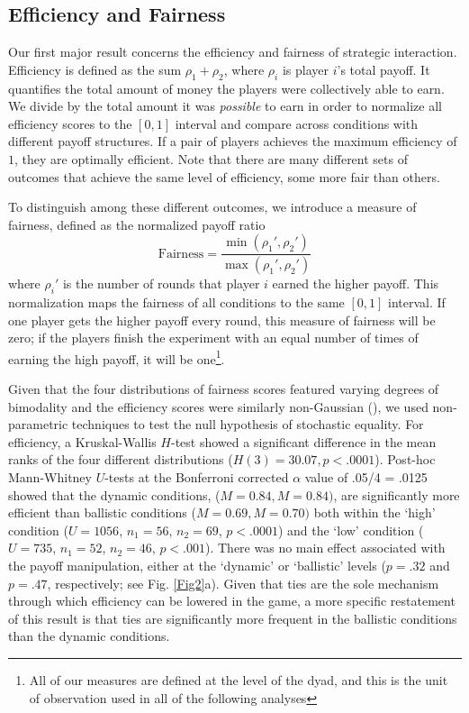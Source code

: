 \documentclass[10pt,letterpaper]{article}
\begin{document}
\subsection*{Efficiency and Fairness} Our first major result concerns the efficiency and fairness of strategic interaction. Efficiency is defined as the sum $\rho_1 + \rho_2$, where $\rho_i$ is player $i$'s total payoff. It quantifies the total amount of money the players were collectively able to earn. We divide by the total amount it was \emph{possible} to earn in order to normalize all efficiency scores to the $[0,1]$ interval and compare across conditions with different payoff structures. If a pair of players achieves the maximum efficiency of $1$, they are optimally efficient. Note that there are many different sets of outcomes that achieve the same level of efficiency, some more fair than others.

To distinguish among these different outcomes, we introduce a measure of fairness, defined as the normalized payoff ratio $$\text{Fairness} = \frac{\min(\rho_1', \rho_2')}{\max(\rho_1', \rho_2')}$$ where $\rho_i'$ is the number of rounds that player $i$ earned the higher payoff. This normalization maps the fairness of all conditions to the same $[0,1]$ interval. If one player gets the higher payoff every round, this measure of fairness will be zero; if the players finish the experiment with an equal number of times of earning the high payoff, it will be one\footnote{All of our measures are defined at the level of the dyad, and this is the unit of observation used in all of the following analyses}. 

Given that the four distributions of fairness scores featured varying degrees of bimodality and the efficiency scores were similarly non-Gaussian (), we used non-parametric techniques to test the null hypothesis of stochastic equality. For efficiency, a Kruskal-Wallis $H$-test showed a significant difference in the mean ranks of the four different distributions ($H(3) = 30.07, p < .0001$). Post-hoc Mann-Whitney $U$-tests at the Bonferroni corrected $\alpha$ value of .05/4 = .0125 showed that the dynamic conditions, ($M = 0.84, M = 0.84)$, are significantly more efficient than ballistic conditions ($M = 0.69, M = 0.70)$ both within the `high' condition ($U = 1056$, $n_1 = 56$, $n_2 = 69$, $p < .0001$) and the `low' condition ($U = 735$, $n_1 = 52$, $n_2 = 46$, $p < .001$). There was no main effect associated with the payoff manipulation, either at the `dynamic' or `ballistic' levels ($p = .32$ and $p = .47$, respectively; see Fig. \ref{Fig2}a). Given that ties are the sole mechanism through which efficiency can be lowered in the game, a more specific restatement of this result is that ties are significantly more frequent in the ballistic conditions than the dynamic conditions.
\end{document}
